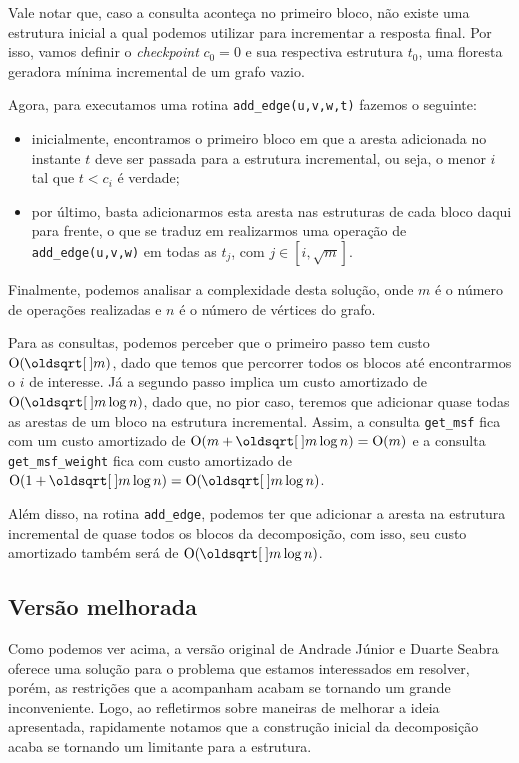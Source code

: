 Vale notar que, caso a consulta aconteça no primeiro bloco, não existe uma estrutura inicial a qual podemos utilizar para incrementar a resposta final. Por isso, vamos definir o \emph{checkpoint} $c_0 = 0$ e sua respectiva estrutura $t_0$, uma floresta geradora mínima incremental de um grafo vazio.

Agora, para executamos uma rotina \texttt{add\_edge(u,v,w,t)} fazemos o seguinte:

\begin{itemize}
    \item inicialmente, encontramos o primeiro bloco em que a aresta adicionada no instante $t$ deve ser passada para a estrutura incremental, ou seja, o menor $i$ tal que $t < c_i$ é verdade;
    \item por último, basta adicionarmos esta aresta nas estruturas de cada bloco daqui para frente, o que se traduz em realizarmos uma operação de \texttt{add\_edge(u,v,w)} em todas as $t_j$, com $j \in [i, \sqrt{m}]$.
\end{itemize}

Finalmente, podemos analisar a complexidade desta solução, onde $m$ é o número de operações realizadas e $n$ é o número de vértices do grafo.

Para as consultas, podemos perceber que o primeiro passo tem custo $\Oh(\sqrt{m})$, dado que temos que percorrer todos os blocos até encontrarmos o $i$ de interesse. Já a segundo passo implica um custo amortizado de $\Oh(\sqrt{m} \log n)$, dado que, no pior caso, teremos que adicionar quase todas as arestas de um bloco na estrutura incremental. Assim, a consulta \texttt{get\_msf} fica com um custo amortizado de $\Oh(m + \sqrt{m} \log n) = \Oh(m)$ e a consulta \texttt{get\_msf\_weight} fica com custo amortizado de $\Oh(1 + \sqrt{m} \log n) = \Oh(\sqrt{m} \log n)$.

Além disso, na rotina \texttt{add\_edge}, podemos ter que adicionar a aresta na estrutura incremental de quase todos os blocos da decomposição, com isso, seu custo amortizado também será de $\Oh(\sqrt{m} \log n)$.

\subsection{Versão melhorada}
\label{sec:rmsf-versao-mel}

Como podemos ver acima, a versão original de Andrade Júnior e Duarte Seabra oferece uma solução para o problema que estamos interessados em resolver, porém, as restrições que a acompanham acabam se tornando um grande inconveniente. Logo, ao refletirmos sobre maneiras de melhorar a ideia apresentada, rapidamente notamos que a construção inicial da decomposição acaba se tornando um limitante para a estrutura.

